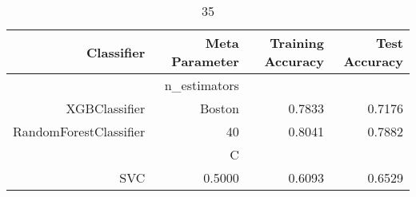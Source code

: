 
\begin{table}[H]
    \caption{35}
    \centering
    \begin{tabular}{|r|r|r|r|}
        \hline
        Classifier &Meta Parameter &Training Accuracy
        &Test Accuracy\\
        \hline
        &n\_estimators &\multicolumn{2}{|r|}{}\\
        \hline
        XGBClassifier &Boston &0.7833 &0.7176\\
        \hline
        RandomForestClassifier &40 &0.8041 &0.7882\\
        \hline
        &C &\multicolumn{2}{|r|}{}\\
        \hline
        SVC &0.5000 &0.6093 &0.6529\\
        \hline
    \end{tabular}
\end{table}
